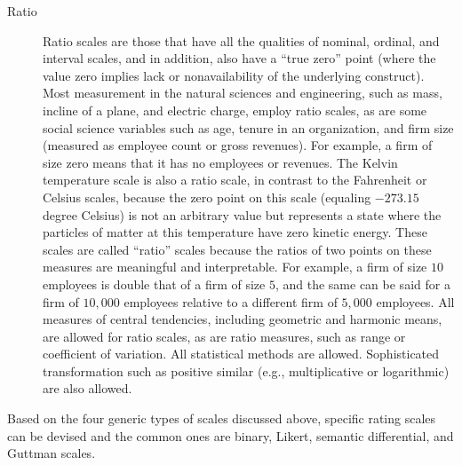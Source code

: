 \begin{description}
	\item[Ratio] Ratio scales are those that have all the qualities of nominal, ordinal, and interval scales, and in addition, also have a ``true zero'' point (where the value zero implies lack or nonavailability of the underlying construct). Most measurement in the natural sciences and engineering, such as mass, incline of a plane, and electric charge, employ ratio scales, as are some social science variables such as age, tenure in an organization, and firm size (measured as employee count or gross revenues). For example, a firm of size zero means that it has no employees or revenues. The Kelvin temperature scale is also a ratio scale, in contrast to the Fahrenheit or Celsius scales, because the zero point on this scale (equaling $ -273.15 $ degree Celsius) is not an arbitrary value but represents a state where the particles of matter at this temperature have zero kinetic energy. These scales are called ``ratio'' scales because the ratios of two points on these measures are meaningful and interpretable. For example, a firm of size $ 10 $ employees is double that of a firm of size $ 5 $, and the same can be said for a firm of $ 10,000 $ employees relative to a different firm of $ 5,000 $ employees. All measures of central tendencies, including geometric and harmonic means, are allowed for ratio scales, as are ratio measures, such as range or coefficient of variation. All statistical methods are allowed. Sophisticated transformation such as positive similar (e.g., multiplicative or logarithmic) are also allowed.
	
\end{description}

Based on the four generic types of scales discussed above, specific rating scales can be devised and the common ones are binary, Likert, semantic differential, and Guttman scales. 

